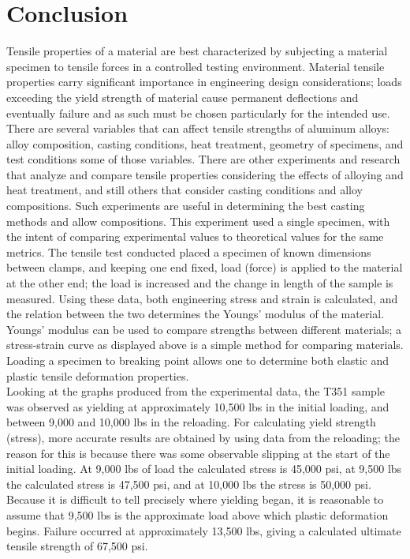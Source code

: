 \documentclass{article}
\begin{document}
    \section{Conclusion}
    \indent Tensile properties of a material are best characterized by subjecting a material specimen to tensile forces in a controlled testing environment. Material tensile properties carry significant importance in engineering design considerations; loads exceeding the yield strength of material cause permanent deflections and eventually failure and as such must be chosen particularly for the intended use.  \\
    \indent There are several variables that can affect tensile strengths of aluminum alloys: alloy composition, casting conditions, heat treatment, geometry of specimens, and test conditions some of those variables. There are other experiments and research that analyze and compare tensile properties considering the effects of alloying and heat treatment, and still others that consider casting conditions and alloy compositions. Such experiments are useful in determining the best casting methods and allow compositions. This experiment used a single specimen, with the intent of comparing experimental values to theoretical values for the same metrics. The tensile test conducted placed a specimen of known dimensions between clamps, and keeping one end fixed, load (force) is applied to the material at the other end; the load is increased and the change in length of the sample is measured. Using these data, both engineering stress and strain is calculated, and the relation between the two determines the Youngs’ modulus of the material. Youngs’ modulus can be used to compare strengths between different materials; a stress-strain curve as displayed above is a simple method for comparing materials. Loading a specimen to breaking point allows one to determine both elastic and plastic tensile deformation properties.  \\
    \indent Looking at the graphs produced from the experimental data, the T351 sample was observed as yielding at approximately 10,500 lbs in the initial loading, and between 9,000 and 10,000 lbs in the reloading. For calculating yield strength (stress), more accurate results are obtained by using data from the reloading; the reason for this is because there was some observable slipping at the start of the initial loading. At 9,000 lbs of load the calculated stress is 45,000 psi, at 9,500 lbs the calculated stress is 47,500 psi, and at 10,000 lbs the stress is 50,000 psi. Because it is difficult to tell precisely where yielding began, it is reasonable to assume that 9,500 lbs is the approximate load above which plastic deformation begins. Failure occurred at approximately 13,500 lbs, giving a calculated ultimate tensile strength of 67,500 psi.  \\
\end{document}
